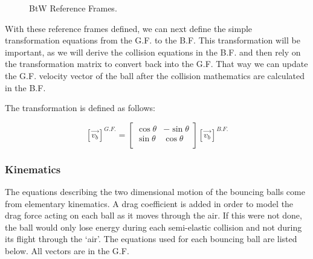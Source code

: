 \documentclass[12pt]{article} %
\begin{document}
\begin{figure}[H] %
\caption{BtW Reference Frames.}
\label{fig:speciation}
\end{figure}

With these reference frames defined, we can next define the simple transformation equations
from the G.F. to the B.F. This transformation will be important, as we will derive the collision
equations in the B.F. and then rely on the transformation matrix to convert back into the G.F. That way we
can update the G.F. velocity vector of the ball after the collision mathematics are calculated in the B.F.

The transformation is defined as follows:

\[
\left[\vec{v_{b}}\right]^{G.F.} =
  \begin{bmatrix}
    \cos{\theta} & -\sin{\theta}\\
    \sin{\theta} & \cos{\theta}\\
  \end{bmatrix}
  \left[\vec{v_{b}}\right]^{B.F.}
\]


\subsubsection{Kinematics} %

The equations describing the two dimensional motion of the bouncing balls come from elementary
kinematics. A drag coefficient is added in order to model the drag force acting on each ball
as it moves through the air. If this were not done, the ball would only lose energy during
each semi-elastic collision and not during its flight through the `air'. The equations used for
each bouncing ball are listed below. All vectors are in the G.F.
\end{document}
